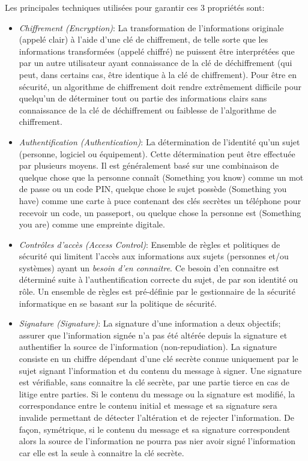 Les principales techniques utilis\'ees pour garantir ces 3 propri\'et\'es sont:
\begin{itemize}
\setlength\itemsep{1em}
\item \emph{Chiffrement (Encryption)}: La transformation de l'informations originale (appel\'e clair) \`a l'aide d'une cl\'e de chiffrement, de telle sorte que les informations transform\'ees (appel\'e chiffr\'e) ne puissent \^etre interpr\'et\'ees que par un autre utilisateur ayant connaissance de la cl\'e de d\'echiffrement (qui peut, dans certains cas, \^etre identique \`a la cl\'e de chiffrement). Pour \^etre en s\'ecurit\'e, un algorithme de chiffrement doit rendre extr\^emement difficile pour quelqu'un de d\'eterminer tout ou partie des informations clairs sans connaissance de la cl\'e de d\'echiffrement ou faiblesse de l'algorithme de chiffrement. 

\item \emph{Authentification (Authentication)}: La d\'etermination de l'identit\'e qu'un sujet (personne, logiciel ou \'equipement). Cette d\'etermination peut \^etre effectu\'ee par plusieurs moyens. Il est g\'en\'eralement bas\'e sur une combinaison de quelque chose que la personne conna\^it (Something you know) comme un mot de passe ou un code PIN, quelque chose le sujet poss\`ede (Something you have) comme une carte \`a puce contenant des cl\'es secr\`etes un t\'el\'ephone pour recevoir un code, un passeport, ou quelque chose la personne est (Something you are) comme une empreinte digitale.

\item \emph{Contr\^oles d'acc\`es (Access Control)}: Ensemble de r\`egles et politiques de s\'ecurit\'e qui limitent l'acc\`es aux informations aux sujets (personnes et/ou syst\`emes) ayant un \emph{besoin d'en connaitre}. Ce besoin d'en connaitre est d\'etermin\'e suite \`a l'authentification correcte du sujet, de par son identit\'e ou r\^ole. Un ensemble de r\`egles est pr\'e-d\'efinie par le gestionnaire de la s\'ecurit\'e informatique en se basant sur la politique de s\'ecurit\'e.

\item \emph{Signature (Signature)}: La signature d'une information a deux objectifs; assurer que l'information sign\'ee n'a pas \'et\'e alt\'er\'ee depuis la signature et authentifier la source de l'information (non-repudiation). La signature consiste en un chiffre d\'ependant d'une cl\'e secr\`ete connue uniquement par le sujet signant l'information et du contenu du message \`a signer. Une signature est v\'erifiable, sans connaitre la cl\'e secr\`ete, par une partie tierce en cas de litige entre parties. Si le contenu du message ou la signature est modifi\'e, la correspondance entre le contenu initial et message et sa signature sera invalide permettant de d\'etecter l'alt\'eration et de rejecter l'information. De fa\c con, sym\'etrique, si le contenu du message et sa signature correspondent alors la source de l'information ne pourra pas nier avoir sign\'e l'information car elle est la seule \`a connaitre la cl\'e secr\`ete.


\end{itemize}
